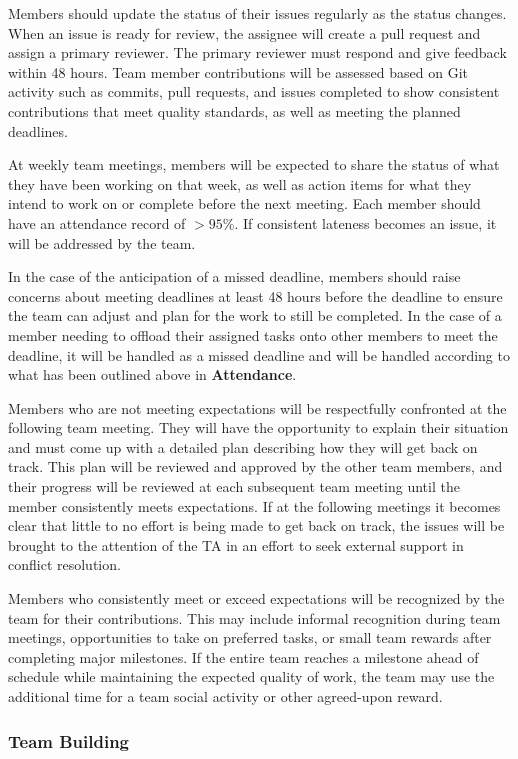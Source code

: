 \documentclass{article}
\begin{document}
Members should update the status of their issues regularly as the status changes. When an issue is ready for review, the assignee will create a pull request and assign a primary reviewer. The primary reviewer must respond and give feedback within 48 hours. Team member contributions will be assessed based on Git activity such as commits, pull requests, and issues completed to show consistent contributions that meet quality standards, as well as meeting the planned deadlines.

At weekly team meetings, members will be expected to share the status of what they have been working on that week, as well as action items for what they intend to work on or complete before the next meeting. Each member should have an attendance record of $>95\%$. If consistent lateness becomes an issue, it will be addressed by the team.

In the case of the anticipation of a missed deadline, members should raise concerns about meeting deadlines at least 48 hours before the deadline to ensure the team can adjust and plan for the work to still be completed. In the case of a member needing to offload their assigned tasks onto other members to meet the deadline, it will be handled as a missed deadline and will be handled according to what has been outlined above in \textbf{Attendance}.

Members who are not meeting expectations will be respectfully confronted at the following team meeting. They will have the opportunity to explain their situation and must come up with a detailed plan describing how they will get back on track. This plan will be reviewed and approved by the other team members, and their progress will be reviewed at each subsequent team meeting until the member consistently meets expectations. If at the following meetings it becomes clear that little to no effort is being made to get back on track, the issues will be brought to the attention of the TA in an effort to seek external support in conflict resolution.

Members who consistently meet or exceed expectations will be recognized by the team for their contributions. This may include informal recognition during team meetings, opportunities to take on preferred tasks, or small team rewards after completing major milestones. If the entire team reaches a milestone ahead of schedule while maintaining the expected quality of work, the team may use the additional time for a team social activity or other agreed-upon reward.

\subsubsection*{Team Building}
\end{document}
